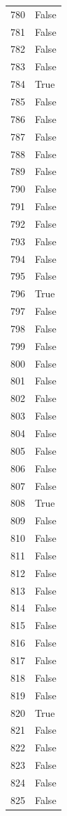\documentclass[
  letterpaper,
  DIV=11,
  numbers=noendperiod]{scrreprt}
\begin{document}
\begin{tabular}{ll}
780  &  False \\
781  &  False \\
782  &  False \\
783  &  False \\
784  &   True \\
785  &  False \\
786  &  False \\
787  &  False \\
788  &  False \\
789  &  False \\
790  &  False \\
791  &  False \\
792  &  False \\
793  &  False \\
794  &  False \\
795  &  False \\
796  &   True \\
797  &  False \\
798  &  False \\
799  &  False \\
800  &  False \\
801  &  False \\
802  &  False \\
803  &  False \\
804  &  False \\
805  &  False \\
806  &  False \\
807  &  False \\
808  &   True \\
809  &  False \\
810  &  False \\
811  &  False \\
812  &  False \\
813  &  False \\
814  &  False \\
815  &  False \\
816  &  False \\
817  &  False \\
818  &  False \\
819  &  False \\
820  &   True \\
821  &  False \\
822  &  False \\
823  &  False \\
824  &  False \\
825  &  False \\

\end{tabular}
\end{document}
